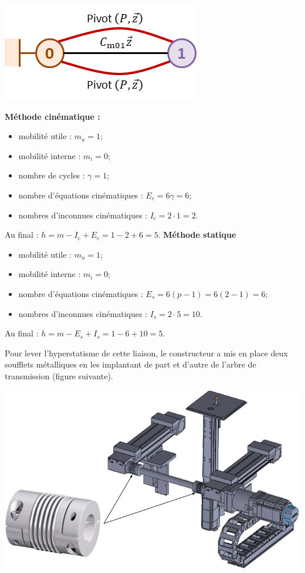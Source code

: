 \documentclass[10pt,fleqn]{article} %
\begin{document}
\begin{multicols}{2}
\begin{corrige}
\begin{center}
\includegraphics[width=\linewidth]{images/cor_01}
\end{center}


\textbf{Méthode cinématique :}
\begin{itemize}
\item mobilité utile : $m_u=1$;
\item mobilité interne : $m_i=0$;
\item nombre de cycles : $\gamma = 1$;
\item nombre d'équations cinématiques : $E_c=6\gamma = 6$;
\item nombres d'inconnues cinématiques : $I_c=2\cdot 1=2$.
\end{itemize}
Au final : $h=m-I_c+E_c=1-2+6=5$.
\textbf{Méthode statique}
\begin{itemize}
\item mobilité utile : $m_u=1$;
\item mobilité interne : $m_i=0$;
\item nombre d'équations cinématiques : $E_s=6(p-1)=6(2-1)= 6$;
\item nombres d'inconnues cinématiques : $I_s=2\cdot 5 = 10$.
\end{itemize}
Au final : $h=m-E_s+I_s=1-6+10=5$.

\end{corrige}
\else
\fi


Pour lever l’hyperstatisme de cette liaison, le constructeur a mis en place deux soufflets métalliques en les implantant de part et d’autre de l’arbre de transmission (figure suivante).

\begin{center}
\includegraphics[width=\linewidth]{images/fig_06}
\end{center}


\end{multicols}
\end{document}
